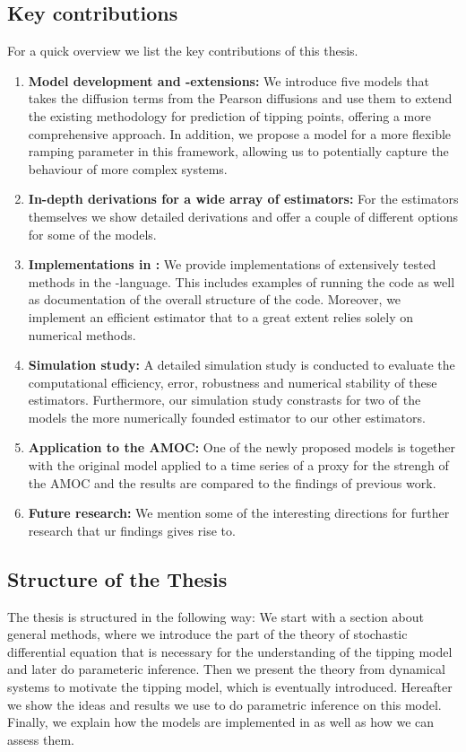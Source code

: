 \subsection{Key contributions}
For a quick overview we list the key contributions of this thesis.
\begin{enumerate}
    \item \textbf{Model development and -extensions:} We introduce five models that takes the diffusion terms from the Pearson diffusions and use them to extend the existing methodology for prediction of tipping points, offering a more comprehensive approach. In addition, we propose a model for a more flexible ramping parameter in this framework, allowing us to potentially capture the behaviour of more complex systems.
    \item \textbf{In-depth derivations for a wide array of estimators:} For the estimators themselves we show detailed derivations and offer a couple of different options for some of the models. 
    \item \textbf{Implementations in :} We provide implementations of extensively tested methods in the -language. This includes examples of running the code as well as documentation of the overall structure of the code. Moreover, we implement an efficient estimator that to a great extent relies solely on numerical methods. 
    \item \textbf{Simulation study:} A detailed simulation study is conducted to evaluate the computational efficiency, error, robustness and numerical stability of these estimators. Furthermore, our simulation study constrasts for two of the models the more numerically founded estimator to our other estimators. 
    \item \textbf{Application to the AMOC:} One of the newly proposed models is together with the original model applied to a time series of a proxy for the strengh of the AMOC and the results are compared to the findings of previous work.
    \item \textbf{Future research:} We mention some of the interesting directions for further research that ur findings gives rise to.
\end{enumerate}
\subsection{Structure of the Thesis}
The thesis is structured in the following way: We start with a section about general methods, where we  introduce the part of the theory of stochastic differential equation that is necessary for the understanding of the tipping model and later do parameteric inference. Then we present the theory from dynamical systems to motivate the tipping model, which is eventually introduced. Hereafter we show the ideas and results we use to do parametric inference on this model. Finally, we explain how the models are implemented in  as well as how we can assess them. 

